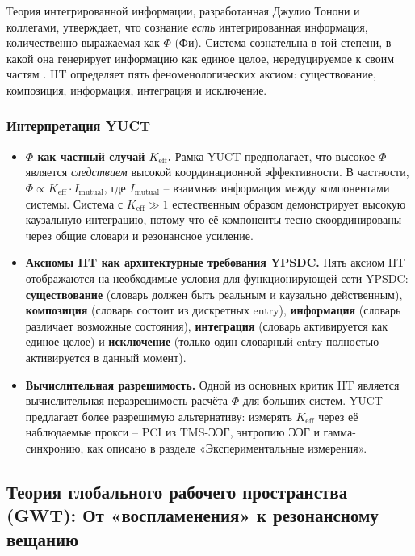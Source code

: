 \documentclass[12pt,a4paper]{article}
\begin{document}
	Теория интегрированной информации, разработанная Джулио Тонони и коллегами, утверждает, что сознание \textit{есть} интегрированная информация, количественно выражаемая как \(\Phi\) (Фи). Система сознательна в той степени, в какой она генерирует информацию как единое целое, нередуцируемое к своим частям \cite{Tononi2008}. IIT определяет пять феноменологических аксиом: существование, композиция, информация, интеграция и исключение.
	
	\subsubsection*{Интерпретация YUCT}
	\begin{itemize}
		\item \textbf{\(\Phi\) как частный случай \(K_{\mathrm{eff}}\).} Рамка YUCT предполагает, что высокое \(\Phi\) является \textit{следствием} высокой координационной эффективности. В частности, \(\Phi \propto K_{\mathrm{eff}} \cdot I_{\text{mutual}}\), где \(I_{\text{mutual}}\) – взаимная информация между компонентами системы. Система с \(K_{\mathrm{eff}} \gg 1\) естественным образом демонстрирует высокую каузальную интеграцию, потому что её компоненты тесно скоординированы через общие словари и резонансное усиление.
		\item \textbf{Аксиомы IIT как архитектурные требования YPSDC.} Пять аксиом IIT отображаются на необходимые условия для функционирующей сети YPSDC: \textbf{существование} (словарь должен быть реальным и каузально действенным), \textbf{композиция} (словарь состоит из дискретных entry), \textbf{информация} (словарь различает возможные состояния), \textbf{интеграция} (словарь активируется как единое целое) и \textbf{исключение} (только один словарный entry полностью активируется в данный момент).
		\item \textbf{Вычислительная разрешимость.} Одной из основных критик IIT является вычислительная неразрешимость расчёта \(\Phi\) для больших систем. YUCT предлагает более разрешимую альтернативу: измерять \(K_{\mathrm{eff}}\) через её наблюдаемые прокси – PCI из TMS-ЭЭГ, энтропию ЭЭГ и гамма-синхронию, как описано в разделе «Экспериментальные измерения».
	\end{itemize}
	
	\subsection{Теория глобального рабочего пространства (GWT): От «воспламенения» к резонансному вещанию}
	
\end{document}
